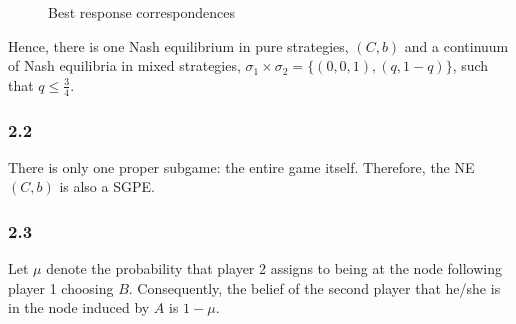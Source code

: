 \documentclass[]{article}
\begin{document}
\begin{figure}[h]
	\centering
	\caption{Best response correspondences}
	\label{fig:ex2br}
\end{figure}

Hence, there is one Nash equilibrium in pure strategies, $(C, b)$ and a continuum of Nash equilibria in mixed strategies, $\sigma_1\times\sigma_2 = \{(0, 0, 1), (q, 1 - q)\}$, such that $q \leq \frac{3}{4}$.

\subsubsection*{2.2}
There is only one proper subgame: the entire game itself. Therefore, the NE $(C, b)$ is also a SGPE.

\subsubsection*{2.3}

Let $\mu$ denote the probability that player 2 assigns to being at the node following player 1 choosing $B$. Consequently, the belief of the second player that he/she is in the node induced by $A$ is $1 - \mu$.
\end{document}
